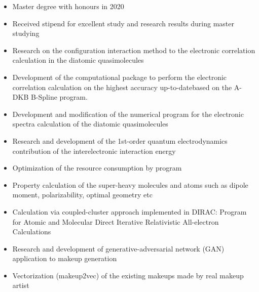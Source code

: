 
\begin{itemize}
    \item Master degree with honours in 2020
    \item Received stipend for excellent study and research results during master studying
\end{itemize}






\begin{itemize}
\item Research on the configuration interaction method to the electronic correlation calculation in the diatomic quasimolecules
\item Development of the computational package to perform the electronic correlation calculation on the highest accuracy up-to-datebased on the A-DKB B-Spline program.
\end{itemize}

\begin{itemize}
\item Development and modification of the numerical program for the electronic spectra calculation of the diatomic quasimolecules
\item Research and development of the 1st-order quantum electrodynamics contribution of the interelectronic interaction energy
\item Optimization of the resource consumption by program
\end{itemize}

\begin{itemize}
\item Property calculation of the super-heavy molecules and atoms such as dipole moment, polarizability, optimal geometry etc
\item Calculation via coupled-cluster approach implemented in DIRAC: Program for Atomic and Molecular Direct Iterative Relativistic All-electron Calculations
\end{itemize}

\divider

\begin{itemize}
\item Research and development of generative-adversarial network (GAN) application to makeup generation
\item Vectorization (makeup2vec) of the existing makeups made by real makeup artist
\end{itemize}

\cvproject{}